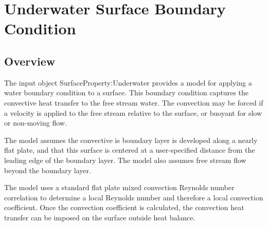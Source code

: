 \section{Underwater Surface Boundary Condition}\label{otherside-conditions-model-underwater}

\subsection{Overview}\label{overview-018}

The input object SurfaceProperty:Underwater provides a model for applying a water boundary condition to a surface.
This boundary condition captures the convective heat transfer to the free stream water.
The convection may be forced if a velocity is applied to the free stream relative to the surface, or buoyant for slow or non-moving flow.

The model assumes the convective is boundary layer is developed along a nearly flat plate, and that this surface is centered at a user-specified distance from the leading edge of the boundary layer.
The model also assumes free stream flow beyond the boundary layer.

The model uses a standard flat plate mixed convection Reynolds number correlation to determine a local Reynolds number and therefore a local convection coefficient.
Once the convection coefficient is calculated, the convection heat transfer can be imposed on the surface outside heat balance.
